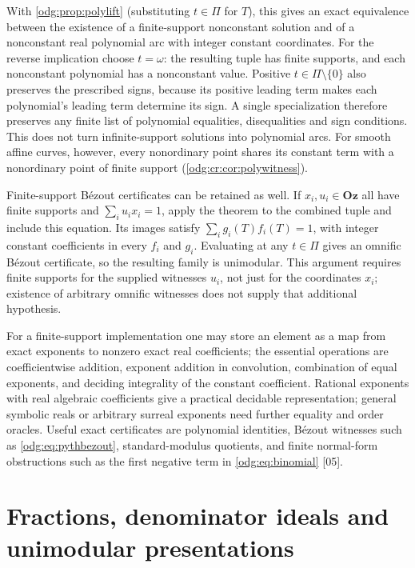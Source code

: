 \documentclass[11pt,oneside]{article}
\numberwithin{equation}{section}
\theoremstyle{definition}
\theoremstyle{remark}
\newcommand{\Oz}{\mathbf{Oz}}
\newcommand{\src}[1]{\textup{\textsf{\small[#1]}}}
\begin{document}
With \cref{odg:prop:polylift} (substituting $t\in\Pi$ for $T$), this gives an
exact equivalence between the existence of a finite-support nonconstant
solution and of a nonconstant real polynomial arc with integer constant
coordinates. For the reverse implication choose $t=\omega$: the resulting
tuple has finite supports, and each nonconstant polynomial has a nonconstant
value. Positive $t\in\Pi\setminus\{0\}$ also preserves the prescribed signs,
because its positive leading term makes each polynomial's leading term
determine its sign. A single specialization therefore preserves any finite
list of polynomial equalities, disequalities and sign conditions. This does
not turn infinite-support solutions into polynomial arcs. For smooth affine curves,
however, every nonordinary point shares its constant term with a nonordinary point
of finite support (\cref{odg:cr:cor:polywitness}).

Finite-support B\'ezout certificates can be retained as well. If
$x_i,u_i\in\Oz$ all have finite supports and $\sum_i u_i x_i=1$, apply the
theorem to the combined tuple and include this equation. Its images satisfy
$\sum_i g_i(T)f_i(T)=1$, with integer constant coefficients in every $f_i$
and $g_i$. Evaluating at any $t\in\Pi$ gives an omnific B\'ezout certificate,
so the resulting family is unimodular. This argument requires finite
supports for the supplied witnesses $u_i$, not just for the coordinates
$x_i$; existence of arbitrary omnific witnesses does not supply that
additional hypothesis.

For a finite-support implementation one may store an element as a map from
exact exponents to nonzero exact real coefficients; the essential operations
are coefficientwise addition, exponent addition in convolution, combination
of equal exponents, and deciding integrality of the constant coefficient.
Rational exponents with real algebraic coefficients give a practical
decidable representation; general symbolic reals or arbitrary surreal
exponents need further equality and order oracles. Useful exact certificates
are polynomial identities, B\'ezout witnesses such as \eqref{odg:eq:pythbezout},
standard-modulus quotients, and finite normal-form obstructions such as the
first negative term in \eqref{odg:eq:binomial} \src{05}.

\section{Fractions, denominator ideals and unimodular presentations}\label{odg:frac:sec:fractions}
\end{document}
